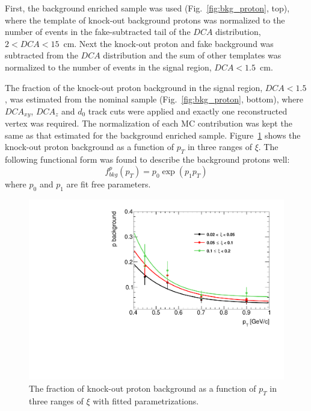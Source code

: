 First, the background enriched sample was used  (Fig.~\ref{fig:bkg_proton}, top), where the template of knock-out background protons was normalized to the number of events in the fake-subtracted tail of the $DCA$ distribution, $2<DCA<15$~cm. Next the knock-out proton and fake background was subtracted from the $DCA$ distribution and the sum of other templates was normalized to the number of events in the signal region,  $DCA<1.5$~cm. 


The fraction of the knock-out proton background in the signal region, $DCA<1.5$, was estimated from the nominal sample (Fig.~\ref{fig:bkg_proton}, bottom), where $DCA_{xy}$, $DCA_z$ and $d_0$ track cuts were applied and exactly one reconstructed vertex was required. The normalization of each MC contribution was kept the same as that estimated for the background enriched sample. Figure~\ref{fig:bkg_proton_fit} shows the knock-out proton background as a function of $p_T$ in three ranges of $\xi$. The following functional form was found to describe the
background protons well:
\begin{equation}
f_{bkg}^{p}\left(p_T\right) = p_0\exp\left(p_1p_T\right)
\label{eq:protonBkgParametrization}
\end{equation}
where  $p_0$ and $p_1$ are fit free parameters. \\
\captionsetup{format=plain,indention=0pt,justification=justified}
\begin{figure}
	\centering
	\vspace{-20pt}
	\includegraphics[width=\linewidth, page=1]{chapters/chrgSTAR/img/DCAproton/bkg_p.pdf}
	\vspace{-20pt}
	\caption{The fraction of knock-out proton background  as a function of $p_T$ in three ranges of $\xi$  with  fitted parametrizations.}
	\vspace{-80pt}
	\label{fig:bkg_proton_fit}
\end{figure}

